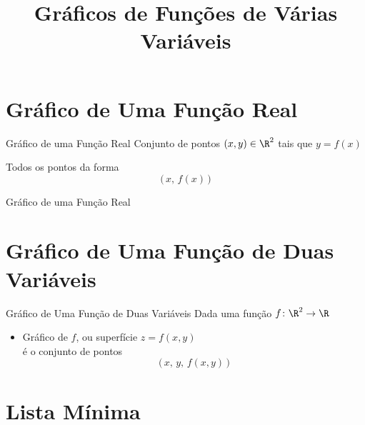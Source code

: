 \documentclass[fleqn,utf8,aspectratio=169,12pt,ignorenonframetext]{beamer}
\title{Gráficos de Funções de Várias Variáveis}
\begin{document}
\addtitle

\section{Gráfico de Uma Função Real}

\begin{frame}{Gráfico de uma Função Real}
  Conjunto de pontos $(x, y) \in \R^2$ tais que \(y = f(x)\)

  \pause
  \vspace{\baselineskip}
  Todos os pontos da forma
  \[
    \big( \, x, \, f(x) \, \big)
  \]
\end{frame}

\begin{frame}{Gráfico de uma Função Real}
  \centering
  
\end{frame}

\section{Gráfico de Uma Função de Duas Variáveis}

\begin{frame}{Gráfico de Uma Função de Duas Variáveis}
  Dada uma função \(f\colon\R^2\to\R\)
  \begin{itemize}[<+->]
    \item Gráfico de $f$, ou superfície \(z=f(x, y)\) \\
    é o conjunto de pontos
    \[
      \big( \, x, \, y, \, f(x, y) \, \big)
    \]
  \end{itemize}
\end{frame}



\section{Lista Mínima}
\end{document}
